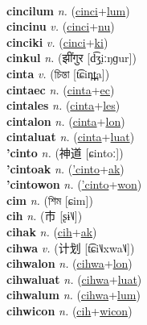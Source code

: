  \label{cincilon} \\
\textbf{cincilum} \textit{n.} (\hyperref[cinci]{cinci}+\hyperref[lum]{lum})
 \label{cincilum} \\
\textbf{cincinu} \textit{v.} (\hyperref[cinci]{cinci}+\hyperref[nu]{nu})
 \label{cincinu} \\
\textbf{cinciki} \textit{v.} (\hyperref[cinci]{cinci}+\hyperref[ki]{ki})
 \label{cinciki} \\
\textbf{cinkul} \textit{n.} ({\devanagari{}झींगुर} [d͡ʒ̤iːŋɡur])
 \label{cinkul} \\
\textbf{cinta} \textit{v.} ({\bengali{}চিন্তা} [t͡ɕin̪t̪a])
 \label{cinta} \\
\textbf{cintaec} \textit{n.} (\hyperref[cinta]{cinta}+\hyperref[ec]{ec})
 \label{cintaec} \\
\textbf{cintales} \textit{n.} (\hyperref[cinta]{cinta}+\hyperref[les]{les})
 \label{cintales} \\
\textbf{cintalon} \textit{n.} (\hyperref[cinta]{cinta}+\hyperref[lon]{lon})
 \label{cintalon} \\
\textbf{cintaluat} \textit{n.} (\hyperref[cinta]{cinta}+\hyperref[luat]{luat})
 \label{cintaluat} \\
\textbf{'cinto} \textit{n.} ({\japanese{}神道} [ɕintoː])
 \label{'cinto} \\
\textbf{'cintoak} \textit{n.} (\hyperref['cinto]{'cinto}+\hyperref[ak]{ak})
 \label{'cintoak} \\
\textbf{'cintowon} \textit{n.} (\hyperref['cinto]{'cinto}+\hyperref[won]{won})
 \label{'cintowon} \\
\textbf{cim} \textit{n.} ({\bengali{}শিম} [ɕim])
 \label{cim} \\
\textbf{cih} \textit{n.} ({\chinese{}市} [ʂɨ˥˩])
 \label{cih} \\
\textbf{cihak} \textit{n.} (\hyperref[cih]{cih}+\hyperref[ak]{ak})
 \label{cihak} \\
\textbf{cihwa} \textit{v.} ({\chinese{}计划} [t͡ɕi˥˩xwa˥˩])
 \label{cihwa} \\
\textbf{cihwalon} \textit{n.} (\hyperref[cihwa]{cihwa}+\hyperref[lon]{lon})
 \label{cihwalon} \\
\textbf{cihwaluat} \textit{n.} (\hyperref[cihwa]{cihwa}+\hyperref[luat]{luat})
 \label{cihwaluat} \\
\textbf{cihwalum} \textit{n.} (\hyperref[cihwa]{cihwa}+\hyperref[lum]{lum})
 \label{cihwalum} \\
\textbf{cihwicon} \textit{n.} (\hyperref[cih]{cih}+\hyperref[wicon]{wicon})
 \label{cihwicon} \\
